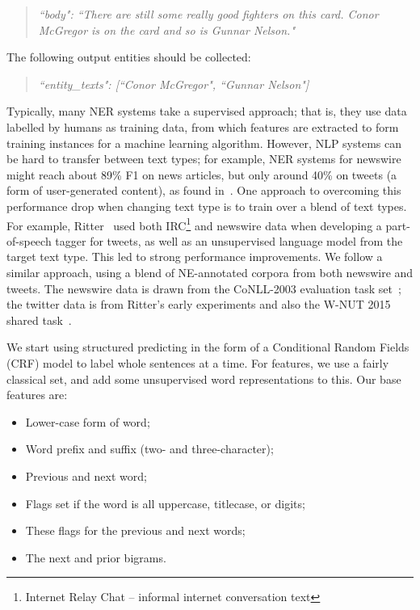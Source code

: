 \documentclass[10pt,journal,compsoc]{IEEEtran}
\begin{document}
\begin{quote}
\emph{``body": ``There are still some really good fighters on this card. Conor McGregor is on the card and so is Gunnar Nelson."}
\end{quote}

The following output entities should be collected:

\begin{quote}
\emph{``entity\_texts": [``Conor McGregor", ``Gunnar Nelson"]}
\end{quote}

Typically, many NER systems take a supervised approach; that is, they use data labelled by humans as training data, from which features are extracted to form training instances for a machine learning algorithm.
However, NLP systems can be hard to transfer between text types; for example, NER systems for newswire might reach about 89\% F1 on news articles, but only around 40\% on tweets (a form of user-generated content), as found in~\cite{derczynski2015analysis}.
One approach to overcoming this performance drop when changing text type is to train over a blend of text types.
For example, Ritter~\cite{ritter2011named} used both IRC\footnote{Internet Relay Chat -- informal internet conversation text} and newswire data when developing a part-of-speech tagger for tweets, as well as an unsupervised language model from the target text type.
This led to strong performance improvements.
We follow a similar approach, using a blend of NE-annotated corpora from both newswire and tweets.
The newswire data is drawn from the CoNLL-2003 evaluation task set~\cite{tjong2003introduction}; the twitter data is from Ritter's early experiments and also the W-NUT 2015 shared task~\cite{ritter2011named,baldwin2015shared}.

We start using structured predicting in the form of a Conditional Random Fields (CRF) model to label whole sentences at a time.
For features, we use a fairly classical set, and add some unsupervised word representations to this.
Our base features are:

\begin{itemize}
\item Lower-case form of word;
\item Word prefix and suffix (two- and three-character);
\item Previous and next word;
\item Flags set if the word is all uppercase, titlecase, or digits;
\item These flags for the previous and next words;
\item The next and prior bigrams.
\end{itemize}
\end{document}
